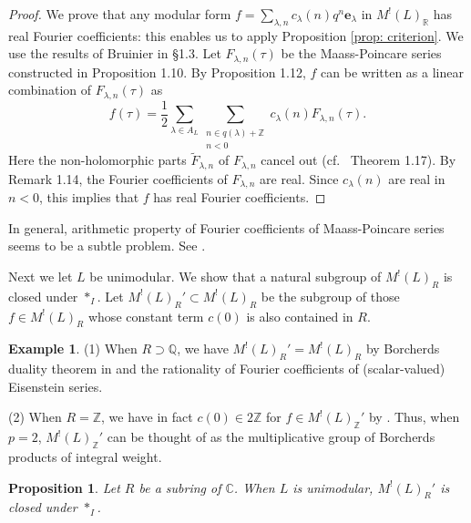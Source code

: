 \documentclass[12pt]{amsart}
\numberwithin{equation}{section}
\newtheorem{proposition}[theorem]{Proposition}
\theoremstyle{definition}
\newtheorem{example}[theorem]{Example}
\theoremstyle{remark}
\newcommand{\Z}{\mathbb{Z}}
\newcommand{\Q}{\mathbb{Q}}
\newcommand{\R}{\mathbb{R}}
\newcommand{\C}{\mathbb{C}}
\newcommand{\elambda}{{\mathbf e}_{\lambda}}
\newcommand{\MLR}{M^{!}(L)_{R}}
\begin{document}
\begin{proof}
We prove that any modular form 
$f=\sum_{\lambda,n}c_{\lambda}(n)q^n{\elambda}$ 
in $M^!(L)_{{\R}}$ has real Fourier coefficients: 
this enables us to apply Proposition \ref{prop: criterion}. 
We use the results of Bruinier in \cite{Br} \S 1.3. 
Let $F_{\lambda,n}(\tau)$ be the Maass-Poincare series constructed in \cite{Br} Proposition 1.10. 
By \cite{Br} Proposition 1.12, 
$f$ can be written as a linear combination of $F_{\lambda,n}(\tau)$ as 
\begin{equation*}
f(\tau) = \frac{1}{2} \sum_{\lambda\in A_{L}} \sum_{\substack{n\in q(\lambda)+{\Z} \\ n<0}} 
c_{\lambda}(n) F_{\lambda,n}(\tau). 
\end{equation*}
Here the non-holomorphic parts $\tilde{F}_{\lambda,n}$ of $F_{\lambda,n}$ cancel out (cf.~\cite{Br} Theorem 1.17). 
By \cite{Br} Remark 1.14, 
the Fourier coefficients of $F_{\lambda,n}$ are real. 
Since $c_{\lambda}(n)$ are real in $n<0$, 
this implies that $f$ has real Fourier coefficients. 
\end{proof}

In general, arithmetic property of Fourier coefficients of Maass-Poincare series 
seems to be a subtle problem. 
See \cite{B-F-O-R}. 


Next we let $L$ be unimodular. 
We show that 
a natural subgroup of ${\MLR}$ is closed under $\ast_{I}$. 
Let $M^{!}(L)_{R}'\subset {\MLR}$ be the subgroup of those $f\in {\MLR}$ 
whose constant term $c(0)$ is also contained in $R$. 

\begin{example}
(1) When $R\supset{\Q}$, we have $M^!(L)_{R}'=M^{!}(L)_{R}$ 
by Borcherds duality theorem in \cite{Bo00b} and the rationality of Fourier coefficients of 
(scalar-valued) Eisenstein series. 

(2) When $R={\Z}$, we have in fact $c(0)\in 2{\Z}$ for $f\in M^!(L)_{{\Z}}'$ by \cite{W-W}. 
Thus, when $p=2$, $M^!(L)_{{\Z}}'$ can be thought of as 
the multiplicative group of Borcherds products of integral weight.  
\end{example}


\begin{proposition}\label{prop: Z-part unimodular} 
Let $R$ be a subring of ${\C}$. 
When $L$ is unimodular, $M^{!}(L)_{R}'$ is closed under $\ast_{I}$. 
\end{proposition}
\end{document}
